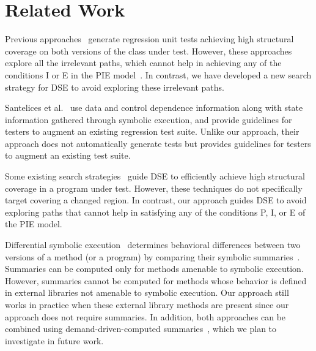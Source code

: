 
\section{Related Work}
\label{sec:related}
Previous approaches~\cite{evans:DiffTest07,taneja08:diffgen,jin10:automated} generate regression unit tests achieving high structural coverage on both versions of the class under test. However, these approaches explore all the irrelevant paths, which cannot help in achieving any of the conditions I or E in the PIE model~\cite{voas}. In contrast, we have developed a new search strategy for DSE to avoid exploring these irrelevant paths. 

Santelices et al.~\cite{santelices08sep} use data and control dependence information along with state information gathered through symbolic execution, and provide guidelines for testers to augment an existing regression test suite. Unlike our approach, their approach does not automatically generate tests but provides guidelines for testers to augment an existing test suite. 

Some existing search strategies~\cite{burnim,fitnex} guide DSE to efficiently achieve high structural coverage in a program under test. However,
these techniques do not specifically target covering a changed region. In contrast, our approach guides DSE to avoid exploring paths that cannot help in satisfying any of the conditions P, I, or E of the PIE model.

Differential symbolic execution~\cite{DSE} determines behavioral differences between two versions of a method (or a program) by comparing their symbolic summaries~\cite{CSE}. Summaries can be computed only for methods amenable to symbolic execution. However, summaries cannot be computed for methods whose behavior is defined in external libraries not amenable to symbolic execution. Our approach still works in practice when these external library methods are present since our approach does not require summaries. In addition, both approaches can be combined using demand-driven-computed summaries~\cite{demandDriven}, which we plan to investigate in future work.



